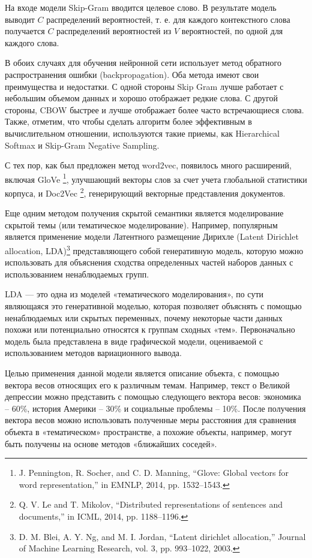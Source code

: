 \documentclass[12pt,a4paper, oneside]{extreport}
\begin{document}
На входе модели Skip-Gram вводится целевое слово. В результате модель выводит $C$  распределений вероятностей, т. е. для каждого контекстного слова получается  $C$  распределений вероятностей из $V$  вероятностей, по одной для каждого слова.

В обоих случаях для обучения нейронной  сети  использует метод обратного распространения ошибки (backpropagation).
Оба метода имеют свои преимущества и недостатки. С одной стороны Skip Gram лучше работает с небольшим объемом данных и хорошо отображает редкие слова.
С другой стороны, CBOW быстрее и лучше отображает более часто встречающиеся слова.
Также, отметим, что  чтобы сделать алгоритм более эффективным в вычислительном отношении, используются такие приемы, как Hierarchical Softmax и Skip-Gram Negative Sampling. 


С тех пор, как был предложен метод  word2vec, появилось много расширений, включая GloVe \footnote{J. Pennington, R. Socher, and C. D. Manning, “Glove: Global 	vectors for word representation,” in EMNLP, 2014, pp. 1532–1543.}, улучшающий  векторы слов за счет учета глобальной статистики корпуса, и Doc2Vec \footnote{Q. V. Le and T. Mikolov, “Distributed representations of sentences 	and documents,” in ICML, 2014, pp. 1188–1196.}, генерирующий векторные  представления документов. 

Еще одним методом получения скрытой семантики является моделирование скрытой темы (или тематическое моделирование). Например, популярным является применение   модели Латентного  размещение Дирихле (Latent Dirichlet allocation, LDA)\footnote{D. M. Blei, A. Y. Ng, and M. I. Jordan, “Latent dirichlet allocation,” Journal of Machine Learning Research, vol. 3, pp. 993–1022, 	2003.} представляющего собой генеративную модель, которую можно использовать для объяснения сходства определенных частей наборов данных с использованием ненаблюдаемых групп. 

LDA — это одна из моделей «тематического  моделирования», по сути являющаяся это генеративной  моделью, которая позволяет объяснять  с помощью ненаблюдаемых или скрытых переменных,  почему некоторые части данных похожи или потенциально относятся к группам сходных «тем». 
Первоначально модель была представлена  в виде  графической модели, оцениваемой  с использованием методов вариационного вывода. 

Целью применения данной модели является описание объекта, с помощью вектора весов относящих его к различным темам. Например, текст о Великой депрессии можно представить с помощью следующего  вектора весов: экономика --  60\%, история Америки -- 30\% и  социальные проблемы  -- 10\%.  После получения вектора весов  можно использовать полученные меры расстояния для сравнения объекта в «тематическом» пространстве, а похожие объекты, например,  могут  быть получены на основе методов «ближайших соседей». 
\end{document}
